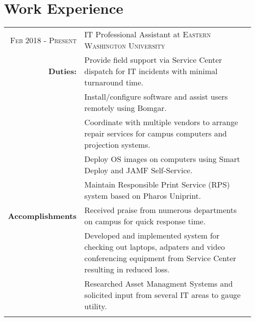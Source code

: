 \documentclass[a4paper,10pt]{article}
\begin{document}
\section{Work Experience}
\begin{tabular}{r|p{14cm}}
\textsc{Feb 2018 - Present} & IT Professional Assistant at \textsc{Eastern Washington University}\\
	\textbf{Duties:}& \footnotesize{\textbullet Provide field support via Service Center dispatch for IT incidents with minimal turnaround time.}\\
	& \footnotesize{\textbullet Install/configure software and assist users remotely using Bomgar. } \\
	& \footnotesize{\textbullet Coordinate with multiple vendors to arrange repair services for campus computers and projection systems.}\\
	& \footnotesize{\textbullet Deploy OS images on computers using Smart Deploy and JAMF Self-Service.}\\
	& \footnotesize{\textbullet Maintain Responsible Print Service (RPS) system based on Pharos Uniprint.}\\
	\textbf{Accomplishments} & \footnotesize{\textbullet Received praise from numerous departments on campus for quick response time.}\\
	& \footnotesize{\textbullet Developed and implemented system for checking out laptops, adpaters and video conferencing equipment from Service Center resulting in reduced loss.}\\
	& \footnotesize{\textbullet Researched Asset Managment Systems and solicited input from several IT areas to gauge utility.}\\
	\multicolumn{2}{c}{} \\


\end{tabular}
\end{document}
